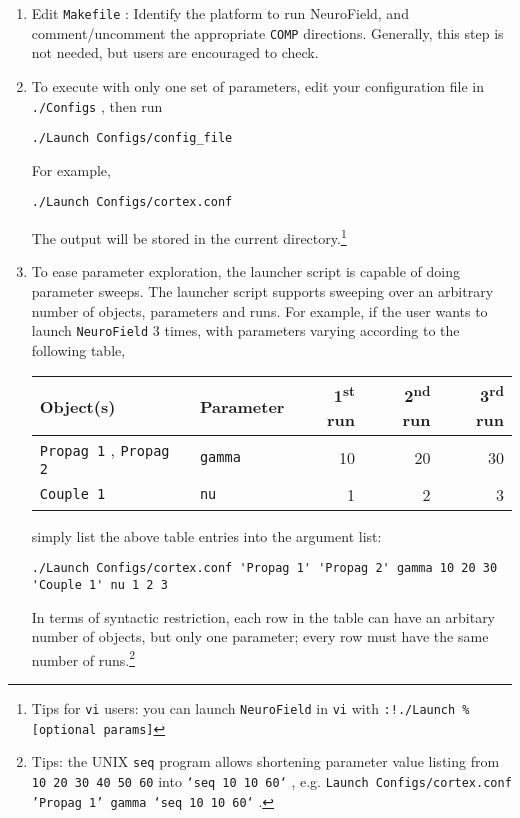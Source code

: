 \documentclass[12pt,a4paper]{article}
\newcommand{\type}[1]{ {\small\small\tt #1} }
\begin{document}
\begin{enumerate}

\item Edit \type{Makefile}: Identify the platform to run NeuroField, and comment/uncomment the appropriate \type{COMP} directions. Generally, this step is not needed, but users are encouraged to check.

\item To execute with only one set of parameters, edit your configuration file in \type{./Configs}, then run
\begin{lstlisting}
./Launch Configs/config_file
\end{lstlisting}
For example,
\begin{lstlisting}
./Launch Configs/cortex.conf
\end{lstlisting}
The output will be stored in the current directory.\footnote{Tips for \type{vi} users: you can launch \type{NeuroField} in \type{vi} with \type{:!./Launch \% [optional params]} }

\item To ease parameter exploration, the launcher script is capable of doing parameter sweeps. The launcher script supports sweeping over an arbitrary number of objects, parameters and runs. For example, if the user wants to launch \type{NeuroField} 3 times, with parameters varying according to the following table,

\begin{tabular}{l l r r r}
Object(s)&Parameter&1\textsuperscript{st} run&2\textsuperscript{nd} run&3\textsuperscript{rd} run\\
\hline
\type{Propag 1}, \type{Propag 2}&\type{gamma}&10&20&30\\
\type{Couple 1}&\type{nu}&1&2&3
\end{tabular}

simply list the above table entries into the argument list:
\begin{lstlisting}
./Launch Configs/cortex.conf 'Propag 1' 'Propag 2' gamma 10 20 30 'Couple 1' nu 1 2 3
\end{lstlisting}

In terms of syntactic restriction, each row in the table can have an arbitary number of objects, but only one parameter; every row must have the same number of runs.\footnote{Tips: the UNIX \type{seq} program allows shortening parameter value listing from \type{10 20 30 40 50 60} into \type{`seq 10 10 60`}, e.g. \type{Launch Configs/cortex.conf 'Propag 1' gamma `seq 10 10 60`}.}


\end{enumerate}
\end{document}
